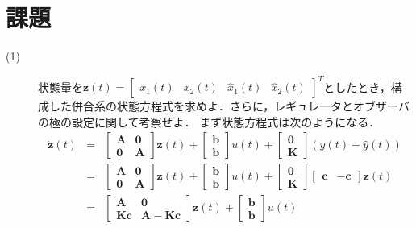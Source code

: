 \documentclass[12pt]{jsarticle}
\begin{document}
\section{課題}
\begin{description}
  \item[(1)] 状態量を${\bm z}(t) = \left[\begin{array}{cccc}x_1(t) & x_2(t) & \hat{x}_1(t) & \hat{x}_2(t)\end{array}\right]^T$としたとき，構成した併合系の状態方程式を求めよ．さらに，レギュレータとオブザーバの極の設定に関して考察せよ．
  まず状態方程式は次のようになる．
\begin{eqnarray}
  \label{kadai-1}
  {\bm \dot{z}}(t) &=& \left[\begin{array}{cc}{\bm A}&{\bm 0}\\{\bm 0}&{\bm A}\end{array}\right] {\bm z}(t) + \left[\begin{array}{c}{\bm b}\\{\bm b}\end{array}\right] u(t) + \left[\begin{array}{c}{\bm 0}\\{\bm K}\end{array}\right] (y(t) - \hat{y}(t)) \nonumber \\
&=& \left[\begin{array}{cc}{\bm A}&{\bm 0}\\{\bm 0}&{\bm A}\end{array}\right] {\bm z}(t) + \left[\begin{array}{c}{\bm b}\\{\bm b}\end{array}\right] u(t) + \left[\begin{array}{c}{\bm 0}\\{\bm K}\end{array}\right] \left[\begin{array}{cc}{\bm c}&-{\bm c}\end{array}\right]{\bm z}(t) \nonumber \\
&=& \left[\begin{array}{cc}{\bm A}&{\bm 0}\\{\bm K}{\bm c}&{\bm A}-{\bm K}{\bm c}\end{array}\right] {\bm z}(t) + \left[\begin{array}{c}{\bm b}\\{\bm b}\end{array}\right] u(t) \nonumber \\

\end{eqnarray}
\end{description}
\end{document}
